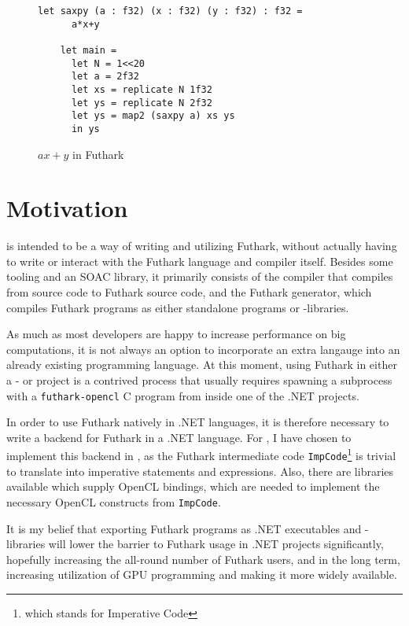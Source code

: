 \begin{figure}
  \centering
  \begin{lstlisting}[language=Futhark]
    let saxpy (a : f32) (x : f32) (y : f32) : f32 =
      a*x+y

    let main =
      let N = 1<<20
      let a = 2f32
      let xs = replicate N 1f32
      let ys = replicate N 2f32
      let ys = map2 (saxpy a) xs ys
      in ys
  \end{lstlisting}
  \caption{$ax+y$ in Futhark}
  \label{fig:futsaxpy}
\end{figure}

\clearpage
\section*{Motivation}
\fshark{} is intended to be a way of writing and utilizing Futhark, without
actually having to write or interact with the Futhark language and compiler
itself. Besides some tooling and an \fsharp{} SOAC library, it primarily consists of the \fshark{} compiler that compiles from
\fsharp{} source code to Futhark source code, and the Futhark \csharp{}
generator, which compiles Futhark programs as either standalone \csharp{}
programs or -libraries.

As much as most developers are happy to increase performance on big
computations, it is not always an option to incorporate an extra langauge into
an already existing programming language. At this moment, using Futhark in
either a \csharp{}- or \fsharp{} project is a contrived process that usually
requires spawning a subprocess with a \texttt{futhark-opencl} C program from inside one of the .NET
projects.

In order to use Futhark natively in .NET languages, it is therefore
necessary to write a backend for Futhark in a .NET language.
For \fshark{}, I have chosen to implement this backend in \csharp{}, as the Futhark intermediate
code \texttt{ImpCode}\footnote{which stands for Imperative Code} is trivial to
translate into imperative \csharp{} statements and expressions.
Also, there are \csharp{} libraries available which supply OpenCL bindings, which are
needed to implement the necessary OpenCL constructs from \texttt{ImpCode}.

It is my belief that exporting Futhark programs as .NET executables and
-libraries will lower the barrier to Futhark usage in .NET projects
significantly, hopefully increasing the all-round number of Futhark users, and
in the long term, increasing utilization of GPU programming and making it more
widely available.

